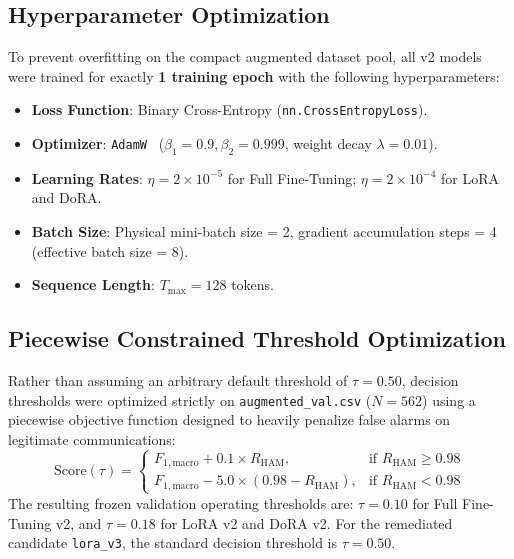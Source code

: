 \documentclass[conference]{IEEEtran}
\begin{document}
\subsection{Hyperparameter Optimization}
To prevent overfitting on the compact augmented dataset pool, all v2 models were trained for exactly \textbf{1 training epoch} with the following hyperparameters:
\begin{itemize}
    \item \textbf{Loss Function}: Binary Cross-Entropy (\texttt{nn.CrossEntropyLoss}).
    \item \textbf{Optimizer}: \texttt{AdamW}~\cite{loshchilov2019adamw} ($\beta_1 = 0.9, \beta_2 = 0.999$, weight decay $\lambda = 0.01$).
    \item \textbf{Learning Rates}: $\eta = 2 \times 10^{-5}$ for Full Fine-Tuning; $\eta = 2 \times 10^{-4}$ for LoRA and DoRA.
    \item \textbf{Batch Size}: Physical mini-batch size = 2, gradient accumulation steps = 4 (effective batch size = 8).
    \item \textbf{Sequence Length}: $T_{\max} = 128$ tokens.
\end{itemize}

\subsection{Piecewise Constrained Threshold Optimization}
Rather than assuming an arbitrary default threshold of $\tau = 0.50$, decision thresholds were optimized strictly on \texttt{augmented\_val.csv} ($N=562$) using a piecewise objective function designed to heavily penalize false alarms on legitimate communications:
\begin{equation}
    \text{Score}(\tau) = 
    \begin{cases} 
        F_{1,\text{macro}} + 0.1 \times R_{\text{HAM}}, & \text{if } R_{\text{HAM}} \ge 0.98 \\ 
        F_{1,\text{macro}} - 5.0 \times (0.98 - R_{\text{HAM}}), & \text{if } R_{\text{HAM}} < 0.98 
    \end{cases}
    \label{eq:threshold_opt}
\end{equation}
The resulting frozen validation operating thresholds are:
$\tau = 0.10$ for Full Fine-Tuning v2, and $\tau = 0.18$ for LoRA v2 and DoRA v2. For the remediated candidate \texttt{lora\_v3}, the standard decision threshold is $\tau = 0.50$.

\end{document}
